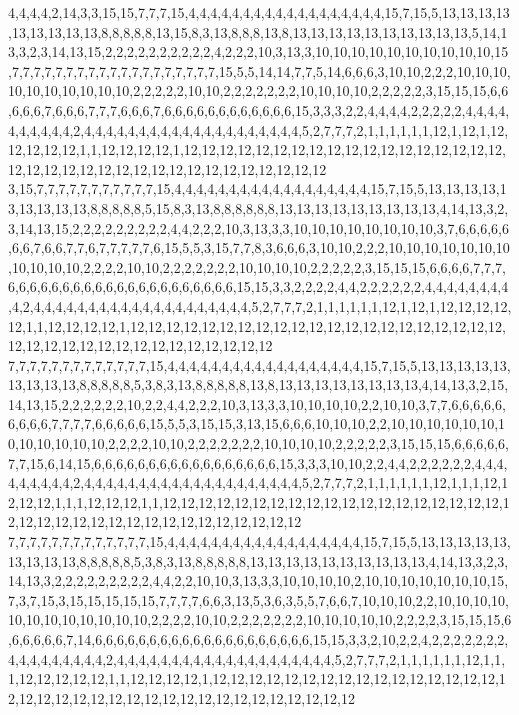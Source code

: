 4,4,4,4,2,14,3,3,15,15,7,7,7,15,4,4,4,4,4,4,4,4,4,4,4,4,4,4,4,4,4,4,15,7,15,5,13,13,13,13,13,13,13,13,13,8,8,8,8,8,13,15,8,3,13,8,8,8,13,8,13,13,13,13,13,13,13,13,13,13,5,14,13,3,2,3,14,13,15,2,2,2,2,2,2,2,2,2,2,4,2,2,2,10,3,13,3,10,10,10,10,10,10,10,10,10,10,15,7,7,7,7,7,7,7,7,7,7,7,7,7,7,7,7,7,7,7,15,5,5,14,14,7,7,5,14,6,6,6,3,10,10,2,2,2,10,10,10,10,10,10,10,10,10,10,2,2,2,2,2,10,10,2,2,2,2,2,2,2,10,10,10,10,2,2,2,2,2,3,15,15,15,6,6,6,6,6,7,6,6,6,7,7,7,6,6,6,7,6,6,6,6,6,6,6,6,6,6,6,6,15,3,3,3,2,2,4,4,4,4,2,2,2,2,2,4,4,4,4,4,4,4,4,4,4,2,4,4,4,4,4,4,4,4,4,4,4,4,4,4,4,4,4,4,4,4,5,2,7,7,7,2,1,1,1,1,1,1,12,1,12,1,12,12,12,12,12,1,1,12,12,12,12,1,12,12,12,12,12,12,12,12,12,12,12,12,12,12,12,12,12,12,12,12,12,12,12,12,12,12,12,12,12,12,12,12,12,12,12,12
3,15,7,7,7,7,7,7,7,7,7,7,7,15,4,4,4,4,4,4,4,4,4,4,4,4,4,4,4,4,4,4,15,7,15,5,13,13,13,13,13,13,13,13,13,8,8,8,8,8,5,15,8,3,13,8,8,8,8,8,8,13,13,13,13,13,13,13,13,13,4,14,13,3,2,3,14,13,15,2,2,2,2,2,2,2,2,2,4,4,2,2,2,10,3,13,3,3,10,10,10,10,10,10,10,10,3,7,6,6,6,6,6,6,6,7,6,6,7,7,6,7,7,7,7,7,6,15,5,5,3,15,7,7,8,3,6,6,6,3,10,10,2,2,2,10,10,10,10,10,10,10,10,10,10,10,2,2,2,2,10,10,2,2,2,2,2,2,2,10,10,10,10,2,2,2,2,2,3,15,15,15,6,6,6,6,7,7,7,6,6,6,6,6,6,6,6,6,6,6,6,6,6,6,6,6,6,6,6,6,15,15,3,3,2,2,2,2,4,4,2,2,2,2,2,2,4,4,4,4,4,4,4,4,4,2,4,4,4,4,4,4,4,4,4,4,4,4,4,4,4,4,4,4,4,4,5,2,7,7,7,2,1,1,1,1,1,1,12,1,12,1,12,12,12,12,12,1,1,12,12,12,12,1,12,12,12,12,12,12,12,12,12,12,12,12,12,12,12,12,12,12,12,12,12,12,12,12,12,12,12,12,12,12,12,12,12,12,12,12
7,7,7,7,7,7,7,7,7,7,7,7,7,15,4,4,4,4,4,4,4,4,4,4,4,4,4,4,4,4,4,4,15,7,15,5,13,13,13,13,13,13,13,13,13,8,8,8,8,8,5,3,8,3,13,8,8,8,8,8,13,8,13,13,13,13,13,13,13,13,4,14,13,3,2,15,14,13,15,2,2,2,2,2,2,10,2,2,4,4,2,2,2,10,3,13,3,3,10,10,10,10,2,2,10,10,3,7,7,6,6,6,6,6,6,6,6,6,7,7,7,7,6,6,6,6,6,15,5,5,3,15,15,3,13,15,6,6,6,10,10,10,2,2,10,10,10,10,10,10,10,10,10,10,10,10,2,2,2,2,10,10,2,2,2,2,2,2,2,10,10,10,10,2,2,2,2,2,3,15,15,15,6,6,6,6,6,7,7,15,6,14,15,6,6,6,6,6,6,6,6,6,6,6,6,6,6,6,6,6,15,3,3,3,10,10,2,2,4,4,2,2,2,2,2,2,4,4,4,4,4,4,4,4,4,2,4,4,4,4,4,4,4,4,4,4,4,4,4,4,4,4,4,4,4,4,5,2,7,7,7,2,1,1,1,1,1,1,12,1,1,1,12,12,12,12,1,1,1,12,12,12,1,1,12,12,12,12,12,12,12,12,12,12,12,12,12,12,12,12,12,12,12,12,12,12,12,12,12,12,12,12,12,12,12,12,12,12,12,12
7,7,7,7,7,7,7,7,7,7,7,7,7,15,4,4,4,4,4,4,4,4,4,4,4,4,4,4,4,4,4,4,15,7,15,5,13,13,13,13,13,13,13,13,13,8,8,8,8,8,5,3,8,3,13,8,8,8,8,8,13,13,13,13,13,13,13,13,13,13,4,14,13,3,2,3,14,13,3,2,2,2,2,2,2,2,2,2,4,4,2,2,10,10,3,13,3,3,10,10,10,10,2,10,10,10,10,10,10,10,15,7,3,7,15,3,15,15,15,15,15,7,7,7,7,6,6,3,13,5,3,6,3,5,5,7,6,6,7,10,10,10,2,2,10,10,10,10,10,10,10,10,10,10,10,10,2,2,2,2,10,10,2,2,2,2,2,2,2,10,10,10,10,10,2,2,2,2,3,15,15,15,6,6,6,6,6,6,7,14,6,6,6,6,6,6,6,6,6,6,6,6,6,6,6,6,6,6,6,6,15,15,3,3,2,10,2,2,4,2,2,2,2,2,2,2,4,4,4,4,4,4,4,4,4,2,4,4,4,4,4,4,4,4,4,4,4,4,4,4,4,4,4,4,4,4,5,2,7,7,7,2,1,1,1,1,1,1,12,1,1,1,12,12,12,12,12,1,1,12,12,12,12,1,12,12,12,12,12,12,12,12,12,12,12,12,12,12,12,12,12,12,12,12,12,12,12,12,12,12,12,12,12,12,12,12,12,12,12,12
